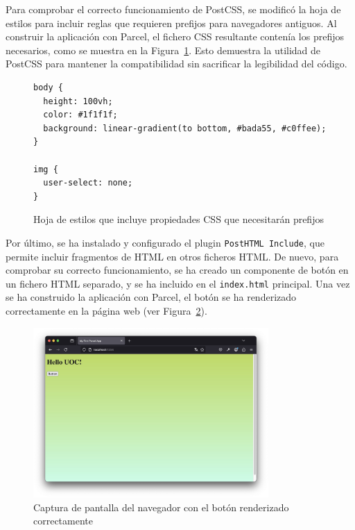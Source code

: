\documentclass{article}
\begin{document}
Para comprobar el correcto funcionamiento de PostCSS, se modificó la hoja de estilos para incluir reglas que requieren prefijos para navegadores antiguos. Al construir la aplicación con Parcel, el fichero CSS resultante contenía los prefijos necesarios, como se muestra en la Figura~\ref{fig:styles-css}. Esto demuestra la utilidad de PostCSS para mantener la compatibilidad sin sacrificar la legibilidad del código.

\begin{figure}[h!]
\begin{verbatim}
body {
  height: 100vh;
  color: #1f1f1f;
  background: linear-gradient(to bottom, #bada55, #c0ffee);
}

img {
  user-select: none;
}
\end{verbatim}
\caption{Hoja de estilos que incluye propiedades CSS que necesitarán prefijos}
\label{fig:styles-css}
\end{figure}

Por último, se ha instalado y configurado el plugin \texttt{PostHTML Include}, que permite incluir fragmentos de HTML en otros ficheros HTML. De nuevo, para comprobar su correcto funcionamiento, se ha creado un componente de botón en un fichero HTML separado, y se ha incluido en el \texttt{index.html} principal. Una vez se ha construido la aplicación con Parcel, el botón se ha renderizado correctamente en la página web (ver Figura~\ref{fig:posthtml-include}).

\begin{figure}[h!]
    \centering
    \includegraphics[width=0.8\textwidth]{./img/after-posthtml-include}
    \caption{Captura de pantalla del navegador con el botón renderizado correctamente}
    \label{fig:posthtml-include}
\end{figure}
\end{document}
